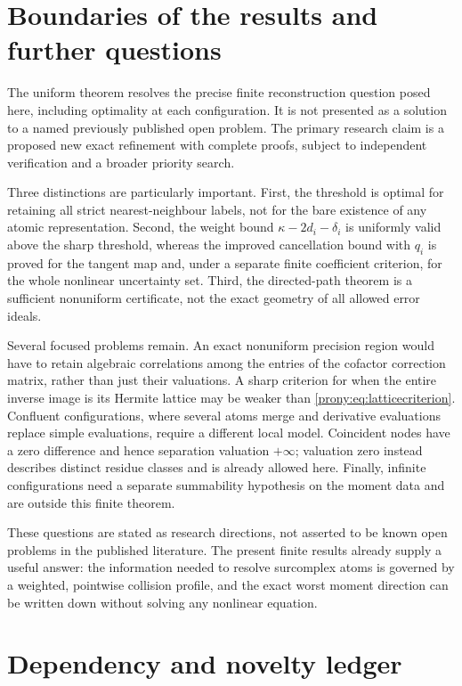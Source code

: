 \documentclass[11pt,letterpaper]{article}
\theoremstyle{definition}
\theoremstyle{remark}
\begin{document}
\section{Boundaries of the results and further questions}
\label{prony:sec:scope}

The uniform theorem resolves the precise finite reconstruction question
posed here, including optimality at each configuration. It is not presented
as a solution to a named previously published open problem. The primary
research claim is a proposed new exact refinement with complete proofs,
subject to independent verification and a broader priority search.

Three distinctions are particularly important. First, the threshold is
optimal for retaining all strict nearest-neighbour labels, not for the
bare existence of any atomic representation. Second, the weight bound
$\kappa-2d_i-\delta_i$ is uniformly valid above the sharp threshold, whereas the
improved cancellation bound with $q_i$ is proved for the tangent map and,
under a separate finite coefficient criterion, for the whole nonlinear
uncertainty set. Third, the directed-path theorem is a sufficient
nonuniform certificate, not the exact geometry of all allowed error ideals.

Several focused problems remain. An exact nonuniform precision region
would have to retain algebraic correlations among the entries of the
cofactor correction matrix, rather than just their valuations. A sharp
criterion for when the entire inverse image is its Hermite lattice may be
weaker than \eqref{prony:eq:latticecriterion}. Confluent configurations, where
several atoms merge and derivative evaluations replace simple evaluations,
require a different local model. Coincident nodes have a zero difference
and hence separation valuation $+\infty$; valuation zero instead describes
distinct residue classes and is already allowed here. Finally, infinite configurations need a
separate summability hypothesis on the moment data and are outside this
finite theorem.

These questions are stated as research directions, not asserted to be
known open problems in the published literature. The present finite
results already supply a useful answer: the information needed to resolve
surcomplex atoms is governed by a weighted, pointwise collision profile,
and the exact worst moment direction can be written down without solving
any nonlinear equation.

\appendix
\section{Dependency and novelty ledger}
\label{prony:app:ledger}
\end{document}

